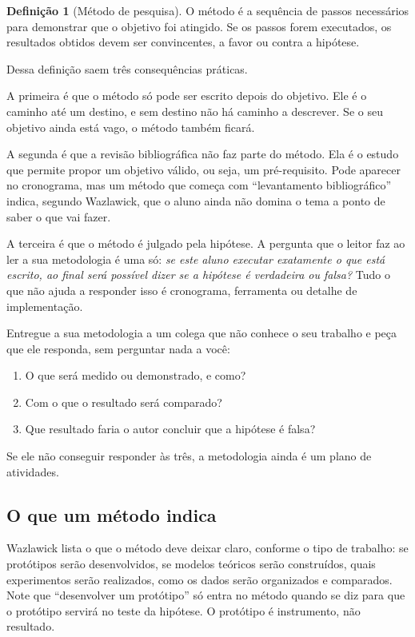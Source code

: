 \documentclass[10pt,a4paper]{extarticle}
\theoremstyle{definition}
\newtheorem{definition}{Definição}[section]
\begin{document}
\begin{definition}[Método de pesquisa]
O método é a sequência de passos necessários para demonstrar que o objetivo foi atingido. Se os passos forem executados, os resultados obtidos devem ser convincentes, a favor ou contra a hipótese.
\end{definition}

Dessa definição saem três consequências práticas.

A primeira é que o método só pode ser escrito depois do objetivo. Ele é o caminho até um destino, e sem destino não há caminho a descrever. Se o seu objetivo ainda está vago, o método também ficará.

A segunda é que a revisão bibliográfica não faz parte do método. Ela é o estudo que permite propor um objetivo válido, ou seja, um pré-requisito. Pode aparecer no cronograma, mas um método que começa com \enquote{levantamento bibliográfico} indica, segundo Wazlawick, que o aluno ainda não domina o tema a ponto de saber o que vai fazer.

A terceira é que o método é julgado pela hipótese. A pergunta que o leitor faz ao ler a sua metodologia é uma só: \emph{se este aluno executar exatamente o que está escrito, ao final será possível dizer se a hipótese é verdadeira ou falsa?} Tudo o que não ajuda a responder isso é cronograma, ferramenta ou detalhe de implementação.

\begin{keybox}
Entregue a sua metodologia a um colega que não conhece o seu trabalho e peça que ele responda, sem perguntar nada a você:
\begin{enumerate}[label=\textbf{\arabic*.}]
  \item O que será medido ou demonstrado, e como?
  \item Com o que o resultado será comparado?
  \item Que resultado faria o autor concluir que a hipótese é falsa?
\end{enumerate}
Se ele não conseguir responder às três, a metodologia ainda é um plano de atividades.
\end{keybox}

\subsection{O que um método indica}

Wazlawick lista o que o método deve deixar claro, conforme o tipo de trabalho: se protótipos serão desenvolvidos, se modelos teóricos serão construídos, quais experimentos serão realizados, como os dados serão organizados e comparados. Note que \enquote{desenvolver um protótipo} só entra no método quando se diz para que o protótipo servirá no teste da hipótese. O protótipo é instrumento, não resultado.
\end{document}
